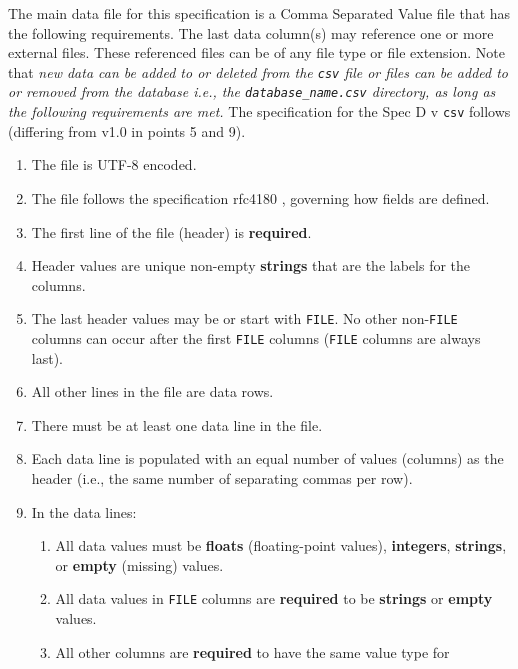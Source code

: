 The main data file for this specification is a Comma Separated Value file that
has the following requirements.  The last data column(s) may reference one or
more external files. These referenced files can be of any file type or file
extension.  Note that \textit{new data can be added to or deleted from the
\texttt{\small csv} file or files can be added to or removed from the database
i.e., the \texttt{\small database\_name.csv} directory, as long as the 
following requirements are met.} The specification for the Spec D v\version
\texttt{\small csv} follows (differing from v1.0 in points 5 and 9).

\begin{enumerate}
\item The file is UTF-8 encoded.
\item The file follows the specification rfc4180 \cite{rfc4180}, governing how
fields are defined.
\item The first line of the file (header) is \textbf{required}.  
\item Header values are unique non-empty \textbf{strings} that are the labels 
for the columns.
\item The last header values may be or start with \texttt{\small FILE}. No 
other non-\texttt{\small FILE} columns can occur after the first
\texttt{\small FILE} columns (\texttt{\small FILE} columns are always last). 
\item All other lines in the file are data rows.
\item There must be at least one data line in the file.
\item Each data line is populated with an equal number of values
(columns) as the header (i.e., the same number of separating commas per row).
\item In the data lines:
\begin{enumerate}
\item All data values must be \textbf{floats} (floating-point values), 
\textbf{integers}, \textbf{strings}, or \textbf{empty} (missing) values.
\item All data values in \texttt{\small FILE} columns are \textbf{required}
to be \textbf{strings} or \textbf{empty} values.
\item All other columns are \textbf{required} to have the same value type for

\end{enumerate}
\end{enumerate}
